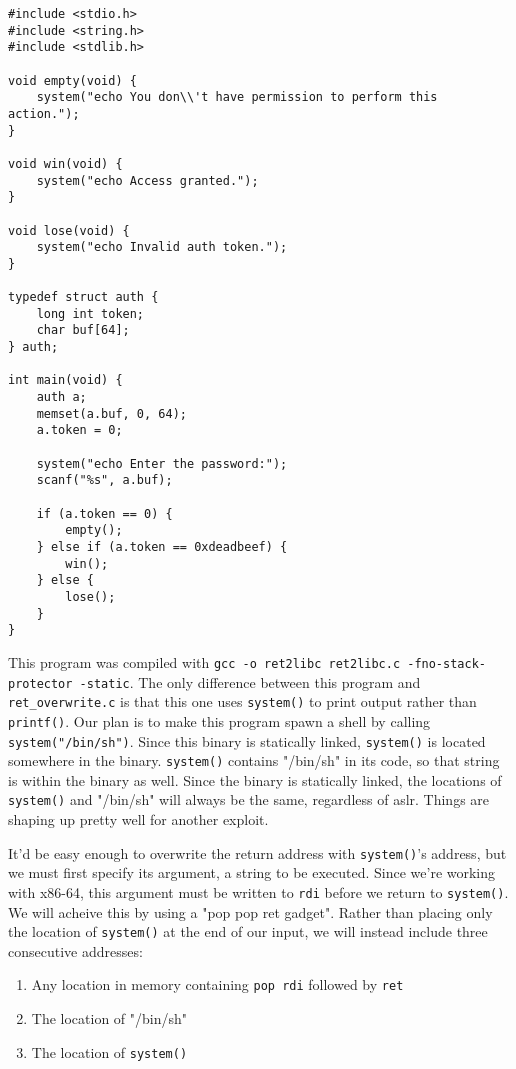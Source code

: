 \begin{lstlisting}
#include <stdio.h>
#include <string.h>
#include <stdlib.h>

void empty(void) {
    system("echo You don\\'t have permission to perform this action.");
}

void win(void) {
    system("echo Access granted.");
}

void lose(void) {
    system("echo Invalid auth token.");
}

typedef struct auth {
    long int token;
    char buf[64];
} auth;

int main(void) {
    auth a;
    memset(a.buf, 0, 64);
    a.token = 0;

    system("echo Enter the password:");
    scanf("%s", a.buf);

    if (a.token == 0) {
        empty();
    } else if (a.token == 0xdeadbeef) {
        win();
    } else {
        lose();
    }
}
\end{lstlisting}

This program was compiled with \texttt{gcc -o ret2libc ret2libc.c
-fno-stack-protector -static}. The only difference between this program and
\texttt{ret\_overwrite.c} is that this one uses \texttt{system()} to print
output rather than \texttt{printf()}. Our plan is to make this program spawn a
shell by calling \texttt{system("/bin/sh")}. Since this binary is statically
linked, \texttt{system()} is located somewhere in the binary. \texttt{system()}
contains "/bin/sh" in its code, so that string is within the binary as well.
Since the binary is statically linked, the locations of \texttt{system()} and
"/bin/sh" will always be the same, regardless of aslr. Things are shaping up
pretty well for another exploit.

It'd be easy enough to overwrite the return address with \texttt{system()}'s
address, but we must first specify its argument, a string to be executed. Since
we're working with x86-64, this argument must be written to \texttt{rdi} before
we return to \texttt{system()}. We will acheive this by using a "pop pop ret
gadget". Rather than placing only the location of \texttt{system()} at the end
of our input, we will instead include three consecutive addresses:

\begin{enumerate}
    \item Any location in memory containing \texttt{pop rdi} followed by
        \texttt{ret}
    \item The location of "/bin/sh"
    \item The location of \texttt{system()}
\end{enumerate}

